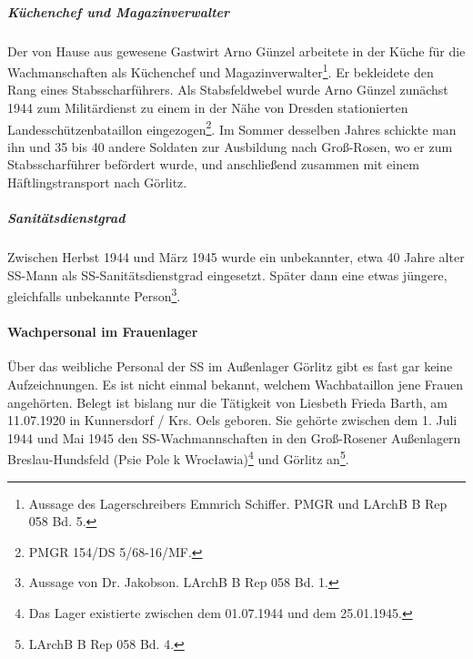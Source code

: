 \documentclass[a4paper,12pt,ngerman,
]{nisebook}
\begin{document}
\subparagraph{Küchenchef und Magazinverwalter}
Der von Hause aus gewesene Gastwirt Arno Günzel arbeitete in der Küche für die Wachmanschaften als Küchenchef und Magazinverwalter\footnote{Aussage des Lagerschreibers Emmrich Schiffer. PMGR und LArchB B Rep 058 Bd. 5.}. Er bekleidete den Rang eines Stabsscharführers.
Als Stabsfeldwebel wurde Arno Günzel zunächst 1944 zum Militärdienst zu einem in der Nähe von Dresden stationierten Landesschützenbataillon eingezogen\footnote{PMGR 154/DS 5/68-16/MF.}. Im Sommer desselben Jahres schickte man ihn und 35 bis 40 andere Soldaten zur Ausbildung nach Groß-Rosen, wo er zum Stabsscharführer befördert wurde, und anschließend zusammen mit einem Häftlingstransport nach Görlitz.


\subparagraph{Sanitätsdienstgrad}
Zwischen Herbst 1944 und März 1945 wurde ein unbekannter, etwa 40 Jahre alter SS-Mann als SS-Sanitätsdienstgrad eingesetzt. Später dann eine etwas jüngere, gleichfalls unbekannte Person\footnote{Aussage von Dr. Jakobson. LArchB B Rep 058 Bd. 1.}.

\paragraph{Wachpersonal im Frauenlager}
Über das weibliche Personal der SS im Außenlager Görlitz gibt es fast gar keine Aufzeichnungen. Es ist nicht einmal bekannt, welchem Wachbataillon jene Frauen angehörten. Belegt ist bislang nur die Tätigkeit von Liesbeth Frieda Barth, am 11.07.1920 in Kunnersdorf / Krs. Oels geboren. Sie gehörte zwischen dem 1. Juli 1944 und Mai 1945 den SS-Wachmannschaften in den Groß-Rosener Außenlagern Breslau-Hundsfeld (Psie Pole k Wroc\l awia)\footnote{Das Lager existierte zwischen dem 01.07.1944 und dem 25.01.1945.} und Görlitz an\footnote{LArchB B Rep 058 Bd. 4.}.
\end{document}
